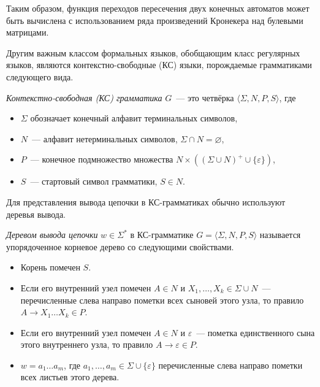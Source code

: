 Таким образом, функция переходов пересечения двух конечных автоматов может быть вычислена с использованием ряда произведений Кронекера над булевыми матрицами.

Другим важным классом формальных языков, обобщающим класс регулярных языков, являются контекстно-свободные (КС) языки, порождаемые грамматиками следующего вида.

\begin{definition}
	\textit{Контекстно-свободная (КС) грамматика} $G$~--- это четвёрка $\langle \Sigma, N, P, S \rangle$, где 
	\begin{itemize}
		\item $\Sigma$ обозначает конечный алфавит терминальных символов, 
		\item $N$~--- алфавит нетерминальных символов, $\Sigma \cap N=\varnothing$, 
		\item $P$~--- конечное подмножество множества $N \times ( (\Sigma \cup N)^+ \cup \{\varepsilon\} )$,  
		\item $S$~--- стартовый символ грамматики, $S  \in N$. 
	\end{itemize}
\end{definition}

Для представления вывода цепочки в КС-грамматиках обычно используют деревья вывода.

\begin{definition}
	\textit{Деревом вывода цепочки} $w \in \Sigma^*$ в КС-грамматике $G=\langle \Sigma, N, P, S \rangle$ называется упорядоченное корневое дерево со следующими свойствами. 
	\begin{itemize}
		\item Корень помечен $S$.
		
		\item Если его внутренний узел помечен $A \in N$ и $X_1, \ldots , X_k \in \Sigma \cup N$~--- перечисленные слева направо пометки всех сыновей этого узла, то правило $A \rightarrow X_1 \ldots X_k \in P$.
		
		\item Если его внутренний узел помечен $A \in N$ и $\varepsilon$~--- пометка единственного сына этого внутреннего узла, то правило $A \rightarrow \varepsilon \in P$.
		
		\item $w = a_1 \ldots a_m$, где $a_1, \ldots , a_m \in \Sigma \cup \{\varepsilon\} $ перечисленные слева направо пометки всех листьев этого дерева.
		
	\end{itemize}
\end{definition}


